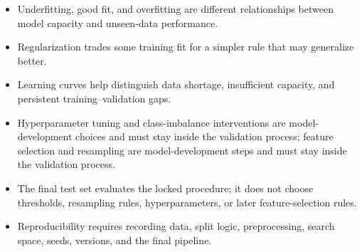 \begin{chapterrecap}
\begin{itemize}
  \item Underfitting, good fit, and overfitting are different relationships between model capacity and unseen-data performance.
  \item Regularization trades some training fit for a simpler rule that may generalize better.
  \item Learning curves help distinguish data shortage, insufficient capacity, and persistent training--validation gaps.
  \item Hyperparameter tuning and class-imbalance interventions are model-development choices and must stay inside the validation process; feature selection and resampling are model-development steps and must stay inside the validation process.
  \item The final test set evaluates the locked procedure; it does not choose thresholds, resampling rules, hyperparameters, or later feature-selection rules.
  \item Reproducibility requires recording data, split logic, preprocessing, search space, seeds, versions, and the final pipeline.
\end{itemize}
\end{chapterrecap}
